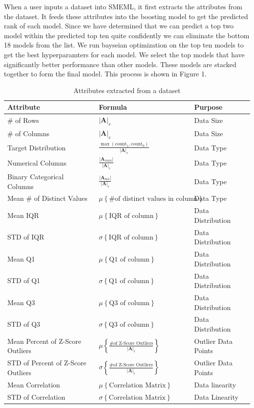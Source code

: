 \documentclass{article}
\begin{document}
When a user inputs a dataset into SMEML, it first extracts the attributes from the dataset. It feeds these attributes into the boosting model to get the predicted rank of each model. Since we have determined that we can predict a top two model within the predicted top ten quite confidently we can eliminate the bottom 18 models from the list. We run bayseian optimization on the top ten models to get the best hyperparamters for each model. We select the top models that have significantly better performance than other models. These models are stacked together to form the final model. This process is shown in Figure 1.
\begin{table}
  \caption{Attributes extracted from a dataset}
  \label{model-options-table}
  \centering
  \begin{tabular}{lll}
    \toprule
    Attribute & Formula & Purpose\\
    \midrule
    \# of Rows & $|\mathbf{A}|_r$ & Data Size \\
    \hline
    \# of Columns & $|\mathbf{A}|_c$ & Data Size \\
    \hline
    Target Distribution &
    $\frac{\max(\text{count}_1, \text{count}_0)}{|\mathbf{A}|_r}$
    & Data Type \\
    \hline
    Numerical Columns &
    $\frac{|\mathbf{A}_{num}|}{|\mathbf{A}|_{c}}$
    & Data Type \\
    \hline
    Binary Categorical Columns &
    $\frac{|\mathbf{A}_{bin}|}{|\mathbf{A}|_{c}}$
    & Data Type \\
    \hline
    Mean \# of Distinct Values  & $\mu \left\{\text{\# of distinct values in column}\right\}$ & Data Type \\ 
    \hline
    Mean IQR  & $\mu \left\{\text{IQR of column}\right\}$ & Data Distribution \\ 
    \hline
    STD of IQR  & $\sigma \left\{\text{IQR of column}\right\}$ & Data Distribution \\
    \hline
    Mean Q1 & $\mu \left\{\text{Q1 of column}\right\}$ & Data Distribution \\
    \hline
    STD of Q1  & $\sigma \left\{\text{Q1 of column}\right\}$ & Data Distribution \\
    \hline
    Mean Q3  & $\mu \left\{\text{Q3 of column}\right\}$ & Data Distribution \\
    \hline
    STD of Q3  & $\sigma \left\{\text{Q3 of column}\right\}$ & Data Distribution \\
    \hline
    Mean Percent of Z-Score Outliers  & 
    $\mu \left\{ \frac{\text{\# of Z-Score Outliers}}{|\mathbf{A}|_r} \right\}$ & Outlier Data Points \\
    \hline
    STD of Percent of Z-Score Outliers  &
    $\sigma \left\{ \frac{\text{\# of Z-Score Outliers}}{|\mathbf{A}|_r} \right\}$ & Outlier Data Points \\
    \hline
    Mean Correlation& $\mu \left\{\text{Correlation Matrix}\right\}$ & Data linearity \\
    \hline
    STD of Correlation & $\sigma \left\{\text{Correlation Matrix}\right\}$ & Data Linearity \\
    \bottomrule
  \end{tabular}
\end{table}
\end{document}
